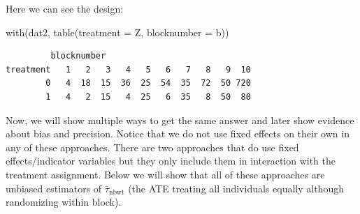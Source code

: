 \documentclass[
  12pt,
]{book}
\newenvironment{Shaded}{\begin{snugshade}}{\end{snugshade}}
\newcommand{\AttributeTok}[1]{\textcolor[rgb]{0.77,0.63,0.00}{#1}}
\newcommand{\DocumentationTok}[1]{\textcolor[rgb]{0.56,0.35,0.01}{\textbf{\textit{#1}}}}
\newcommand{\FunctionTok}[1]{\textcolor[rgb]{0.00,0.00,0.00}{#1}}
\newcommand{\NormalTok}[1]{#1}
\newcommand{\OtherTok}[1]{\textcolor[rgb]{0.56,0.35,0.01}{#1}}
\newcommand{\SpecialCharTok}[1]{\textcolor[rgb]{0.00,0.00,0.00}{#1}}
\theoremstyle{definition}
\theoremstyle{definition}
\theoremstyle{definition}
\theoremstyle{remark}
\begin{document}
\begin{Shaded}
\end{Shaded}

Here we can see the design:

\begin{Shaded}
\begin{Highlighting}[]
\FunctionTok{with}\NormalTok{(dat2, }\FunctionTok{table}\NormalTok{(}\AttributeTok{treatment =}\NormalTok{ Z, }\AttributeTok{blocknumber =}\NormalTok{ b))}
\end{Highlighting}
\end{Shaded}

\begin{verbatim}
         blocknumber
treatment   1   2   3   4   5   6   7   8   9  10
        0   4  18  15  36  25  54  35  72  50 720
        1   4   2  15   4  25   6  35   8  50  80
\end{verbatim}

Now, we will show multiple ways to get the same answer and later show
evidence about bias and precision. Notice that we do not use fixed
effects on their own in any of these approaches. There are two
approaches that do use fixed effects/indicator variables but they only
include them in interaction with the treatment assignment. Below we will
show that all of these approaches are unbiased estimators of
\(\bar{\tau}_{\text{nbwt}}\) (the ATE treating all individuals equally
although randomizing within block).
\end{document}
